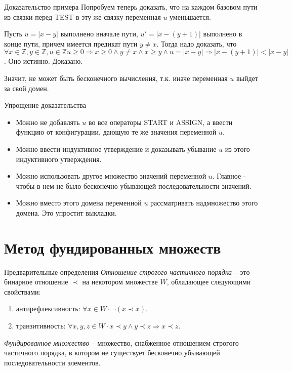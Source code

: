 \documentclass[hyperref={unicode=true}]{beamer}
\begin{document}
    \begin{frame}{Доказательство примера}
    Попробуем теперь доказать, что на каждом базовом пути из связки перед TEST в эту же связку переменная $u$ уменьшается.

    Пусть $u = |x - y|$ выполнено вначале пути, $u' = |x - (y + 1)|$ выполнено в конце пути, причем имеется предикат пути $y \neq x$. Тогда надо доказать, что $\forall x \in \mathbb{Z}, y \in \mathbb{Z}, u \in \mathbb{Z} u \geq 0 \Rightarrow x \geq 0 \land y \neq x \land x \geq y \land u = |x - y| \Rightarrow |x - (y + 1)| < |x - y|$. Оно истинно. Доказано.

    Значит, не может быть бесконечного вычисления, т.к. иначе переменная $u$ выйдет за свой домен.
    \end{frame}

    \begin{frame}{Упрощение доказательства}
    \begin{itemize}
    \item Можно не добавлять $u$ во все операторы START и ASSIGN, а ввести функцию от конфигурации, дающую те же значения переменной $u$.
    \item Можно ввести индуктивное утверждение и доказывать убывание $u$ из этого индуктивного утверждения.
    \item Можно использовать другое множество значений переменной $u$. Главное - чтобы в нем не было бесконечно убывающей последовательности значений.
    \item Можно вместо этого домена переменной $u$ рассматривать надмножество этого домена. Это упростит выкладки.
    \end{itemize}
    \end{frame}

	\section{Метод фундированных множеств}

    \begin{frame}{Предварительные определения}
	\emph{Отношение строгого частичного порядка} -- это бинарное отношение $\prec$ на некотором множестве $W$, обладающее следующими свойствами:
    \begin{enumerate}
    \item антирефлексивность: $\forall x \in W \cdot \neg (x \prec x)$.
    \item транзитивность: $\forall x, y, z \in W \cdot x \prec y \land y \prec z \Rightarrow x \prec z$.
    \end{enumerate}

    \emph{Фундированное множество} -- множество, снабженное отношением строгого частичного порядка, в котором не существует бесконечно убывающей последовательности элементов.
    \end{frame}
\end{document}
